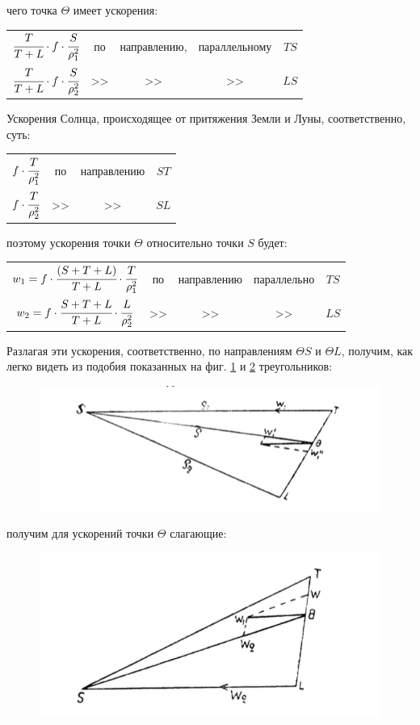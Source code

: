 \documentclass[a4paper,12pt]{article}
\begin{document}
	\noindent  чего точка $\Theta$ имеет ускорения:
	\newpage
	\begin{table}[!h]
		\centering
		\begin{tabular}{rcccc}
			$\cfrac{T}{T+L} \cdot f \cdot \cfrac{S}{\rho_1^2}$ & по & направлению, & параллельному & $TS$ \\[5mm]
			$\cfrac{T}{T+L} \cdot f \cdot \cfrac{S}{\rho_2^2}$ & >> & >> & >> & $LS$
		\end{tabular}
	\end{table}

	Ускорения Солнца, происходящее от притяжения Земли и Луны, соответственно, суть:
	\begin{table}[!h]
		\centering
		\begin{tabular}{cccc}
			$f \cdot \cfrac{T}{\rho_1^2}$ & по & направлению & $ST$ \\[5mm]
			$f \cdot \cfrac{T}{\rho_2^2}$ & >> & >> & $SL$ \\			
		\end{tabular}
	\end{table}
	
	\noindent поэтому ускорения точки $\Theta$ относительно точки $S$ будет:
	\begin{table}[!h]
		\centering
		\begin{tabular}{ccccc}
			$w_1 = f \cdot \cfrac{(S + T + L)}{T + L} \cdot \cfrac{T}{\rho_1^2}$ & по & направлению & параллельно & $TS$ \\[5mm]
			$w_2 = f \cdot \cfrac{S+T+L}{T+L} \cdot \cfrac{L}{\rho_2^2}$ & >> & >>		   & >>			 & $LS$
		\end{tabular}
	\end{table}
	
	\noindent Разлагая эти ускорения, соответственно, по направлениям $\Theta S$ и $\Theta L$, получим, как легко видеть из подобия показанных на фиг. \ref{fig22} и \ref{fig23} треугольников:
	\begin{figure}[h]
		\centering
		\label{fig22}
		\caption{}
		\includegraphics[width=\linewidth]{fig22}
	\end{figure}
	\newpage
	получим для ускорений точки $\Theta$ слагающие:

	\begin{figure}[h]
		\centering
		\label{fig23}
		\caption{}
		\includegraphics[width=0.4\linewidth]{fig23}
	\end{figure}
	
\end{document}
